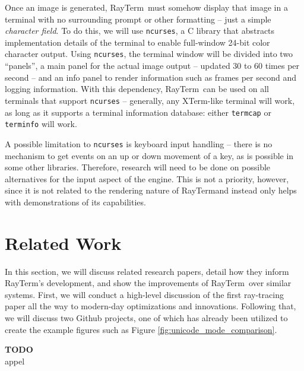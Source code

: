 \documentclass[11pt]{article}
\def\widow#1{\vskip #1\vbadness10000\penalty-200\vskip-#1}
\def\littlesection#1{
  \widow{2cm}
  \vskip 0.5cm
  \noindent{\bf #1}
  \vskip 0.0001cm
}
\newcommand{\name}{{\sc RayTerm}}
\newcommand\todo[1]{
\begin{center}
  \color{red}
  {\bf TODO}\\
  #1
\end{center}
}
\begin{document}
Once an image is generated, \name\ must somehow display that image in a terminal with no surrounding prompt or other formatting -- just a simple {\it character field}.
To do this, we will use \texttt{ncurses}, a C library that abstracts implementation details of the terminal to enable full-window 24-bit color character output.
Using \texttt{ncurses}, the terminal window will be divided into two ``panels'', a main panel for the actual image output -- updated 30 to 60 times per second -- and an info panel to render information such as frames per second and logging information.
With this dependency, \name\ can be used on all terminals that support \texttt{ncurses} -- generally, any XTerm-like terminal will work, as long as it supports a terminal information database: either \texttt{termcap} or \texttt{terminfo} will work.

A possible limitation to \texttt{ncurses} is keyboard input handling -- there is no mechanism to get events on an up or down movement of a key, as is possible in some other libraries.
Therefore, research will need to be done on possible alternatives for the input aspect of the engine.
This is not a priority, however, since it is not related to the rendering nature of \name and instead only helps with demonstrations of its capabilities.

\section{Related Work}
\label{sec:relatedwork}


In this section, we will discuss related research papers, detail how they inform \name's development, and show the improvements of \name\ over similar systems.
First, we will conduct a high-level discussion of the first ray-tracing paper all the way to modern-day optimizations and innovations.
Following that, we will discuss two Github projects, one of which has already been utilized to create the example figures such as Figure \ref{fig:unicode_mode_comparison}.


\littlesection{The First Ray-Tracer}

\todo{appel}
\end{document}
